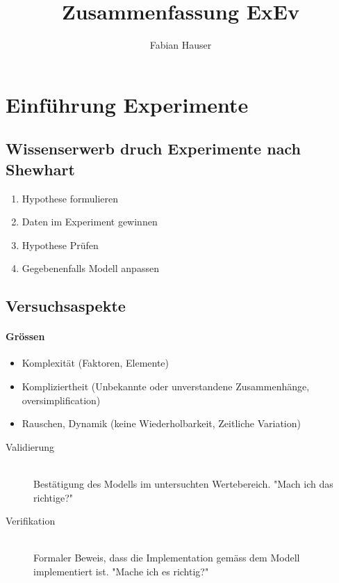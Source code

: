 

\title{Zusammenfassung ExEv}
\author{Fabian Hauser}
 

\maketitle

\section{Einführung Experimente}

\subsection{Wissenserwerb druch Experimente nach Shewhart}
\begin{enumerate}
	\item	Hypothese formulieren
	\item	Daten im Experiment gewinnen
	\item	Hypothese Prüfen
	\item	Gegebenenfalls Modell anpassen
\end{enumerate}

\subsection{Versuchsaspekte}
\paragraph{Grössen}
\begin{itemize}
	\item	Komplexität			(Faktoren, Elemente)
	\item	Kompliziertheit		(Unbekannte oder unverstandene Zusammenhänge, oversimplification)
	\item	Rauschen, Dynamik	(keine Wiederholbarkeit, Zeitliche Variation)
\end{itemize}

\begin{description}
	\item[Validierung] \hfill \\
		Bestätigung des Modells im untersuchten Wertebereich. "Mach ich das richtige?"
	\item[Verifikation] \hfill \\
		Formaler Beweis, dass die Implementation gemäss dem Modell implementiert ist. "Mache ich es richtig?"
\end{description}

